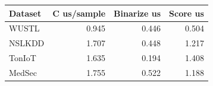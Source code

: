 \begin{tabular}{lrrr}
\toprule
Dataset & C us/sample & Binarize us & Score us \\
\midrule
WUSTL & 0.945 & 0.446 & 0.504 \\
NSLKDD & 1.707 & 0.448 & 1.217 \\
TonIoT & 1.635 & 0.194 & 1.408 \\
MedSec & 1.755 & 0.522 & 1.188 \\
\bottomrule
\end{tabular}
